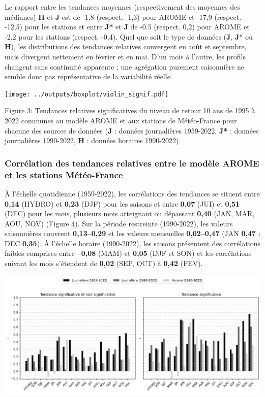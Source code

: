 \documentclass[
  article,
  nofooter,
  noheadings]{jss}
\begin{document}
Le rapport entre les tendances moyennes (respectivement des moyennes des
médianes) \textbf{H} et \textbf{J} est de -1,8 (respect. -1,3) pour
AROME et -17,9 (respect. -12,5) pour les stations et entre \textbf{J*}
et \textbf{J} de -0.5 (respect. 0,2) pour AROME et -2.2 pour les
stations (respect. -0,4). Quel que soit le type de données (\textbf{J},
\textbf{J}* ou \textbf{H}), les distributions des tendances relatives
convergent en août et septembre, mais divergent nettement en février et
en mai. D'un mois à l'autre, les profils changent sans continuité
apparente ; une agrégation purement saisonnière ne semble donc pas
représentative de la variabilité réelle.

\texttt{[image: ../outputs/boxplot/violin\_signif.pdf]}

\begin{center}
Figure 3: Tendances relatives significatives du niveau de retour 10 ans de 1995 à 2022 communes au modèle AROME et aux stations de Météo-France pour chacune des sources de données (\textbf{J} : données journalières 1959-2022, \textbf{J*} : données journalières 1990-2022, \textbf{H} : données horaires 1990-2022).
\end{center}

\subsubsection{Corrélation des tendances relatives entre le modèle AROME
et les stations
Météo-France}\label{corruxe9lation-des-tendances-relatives-entre-le-moduxe8le-arome-et-les-stations-muxe9tuxe9o-france}

À l'échelle quotidienne (1959‑2022), les corrélations des tendances se
situent entre \textbf{0,14} (HYDRO) et \textbf{0,23} (DJF) pour les
saisons et entre \textbf{0,07} (JUI) et \textbf{0,51} (DEC) pour les
mois, plusieurs mois atteignant ou dépassant \textbf{0,40} (JAN, MAR,
AOU, NOV) (Figure 4). Sur la période restreinte (1990‑2022), les valeurs
saisonnières couvrent \textbf{0,13--0,29} et les valeurs mensuelles
\textbf{0,02--0,47} (JAN \textbf{0,47} ; DEC \textbf{0,35}). À l'échelle
horaire (1990‑2022), les saisons présentent des corrélations faibles
comprises entre \textbf{--0,08} (MAM) et \textbf{0,05} (DJF et SON) et
les corrélations suivant les mois s'étendent de \textbf{0,02} (SEP, OCT)
à \textbf{0,42} (FEV).

\includegraphics[width=1\linewidth,height=\textheight,keepaspectratio]{figures/histo_z_T_p.png}
\end{document}
